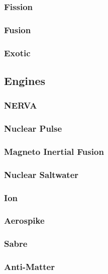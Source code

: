 \subsubsection{Fission}

\subsubsection{Fusion}

\subsubsection{Exotic}

\subsection{Engines}

\subsubsection{NERVA}

\subsubsection{Nuclear Pulse}

\subsubsection{Magneto Inertial Fusion}

\subsubsection{Nuclear Saltwater}

\subsubsection{Ion}

\subsubsection{Aerospike}

\subsubsection{Sabre}

\subsubsection{Anti-Matter}

